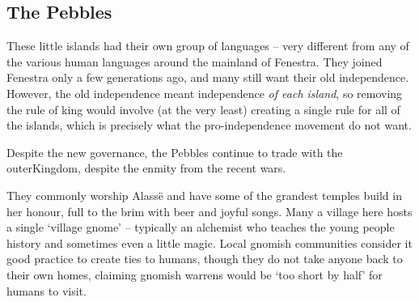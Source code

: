 \begin{multicols}{2}
{\begin{itemize}
  \end{itemize}
}{
  \encPebbles
}


\subsection{The Pebbles}

These little islands had their own group of languages -- very different from any of the various human languages around the mainland of Fenestra.
They joined Fenestra only a few generations ago, and many still want their old independence.
However, the old independence meant independence \emph{of each island}, so removing the rule of \gls{king} would involve (at the very least) creating a single rule for all of the islands, which is precisely what the pro-independence movement do not want.

Despite the new governance, the Pebbles continue to trade with the \gls{outerKingdom}, despite the enmity from the recent wars.

They commonly worship Alass\"{e} and have some of the grandest temples build in her honour, full to the brim with beer and joyful songs.
Many a village here hosts a single `village gnome' -- typically an alchemist who teaches the young people history and sometimes even a little magic.
Local gnomish communities consider it good practice to create ties to humans, though they do not take anyone back to their own homes, claiming gnomish warrens would be `too short by half' for humans to visit.

\iftoggle{players}{
  \subsubsection{Sailing Through the Pebbles}

  The islands provide the most peaceful places in Fenestra.
  Without any forests, they have few beasts, and the islanders all seem to have a jovial mentality.
}{

  \subsubsection{Encounters}
  The people in the Pebbles always say, `when it rains, it pours', and indeed problems tend to come together in the Pebbles.
  Much of this stems from the poor weather upsetting and pushing other factors about.
  Storms can bring rain, or an opportunity for pirates to strike on the seas while a boat seems distracted mending its sails.

}
\end{multicols}
